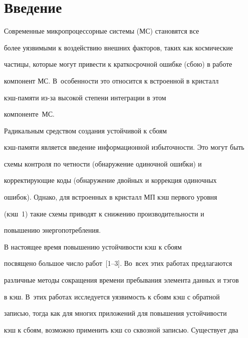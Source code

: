  \thispagestyle{empty}





\section{Введение}





      Современные микропроцессорные системы  (МС) становятся  все 


более уязвимыми к  воздействию внешних факторов, таких как космические 


частицы, которые могут   привести к краткосрочной ошибке (сбою) в работе 


компонент МС. В~особенности это относится к встроенной в кристалл 


      кэш-па\-мя\-ти из-за высокой степени интеграции в этом 


компоненте~МС. 


      


      Радикальным средством  создания  устойчивой  к сбоям 


кэш-па\-мя\-ти является введение информационной  избыточности. Это  могут быть 


схемы контроля по четности (обнаружение одиночной ошибки) и 


корректирующие коды (обнаружение двойных и коррекция  одиночных 


ошибок).  Однако,  для встроенных в кристалл МП кэш первого уровня 


(кэш~1) такие схемы приводят к снижению производительности и 


повышению энергопотребления. 


      


      В  настоящее время повышению устойчивости кэш  к сбоям  


посвящено большое число работ~[1--3]. Во~всех этих работах предлагаются 


различные методы сокращения времени пребывания элемента данных и тэгов   


в кэш. В~этих работах исследуется уязвимость к сбоям кэш с обратной 


записью, тогда как для многих приложений для повышения устойчивости 


кэш к сбоям, возможно применить кэш со сквозной записью. Существует два 



